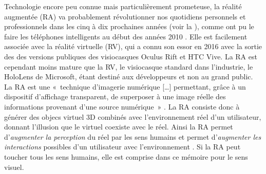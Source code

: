 Technologie encore peu connue mais particulièrement prometeuse, la réalité augmentée (RA) va probablement révolutionner nos quotidiens personnels et professionnels dans les cinq à dix prochaines années (voir la ), comme ont pu le faire les téléphones intelligents au début des années 2010 \citet{Chaffey2018}. Elle est facilement associée avec la réalité virtuelle (RV), qui a connu son essor en 2016 avec la sortie des des versions publiques des visiocasques Oculus Rift et HTC Vive. La RA est cependant moins mature que la RV, le visiocasque standard dans l'industrie, le HoloLens de Microsoft, étant destiné aux développeurs et non au grand public.\\
La RA est une «~technique d'imagerie numérique […] permettant, grâce à un dispositif d'affichage transparent, de superposer à une image réelle des informations provenant d'une source numérique~» \citep{OfficeQuebecoisLangueFrancaiseRA2015}. La RA consiste donc à générer des objecs virtuel 3D combinés avec l'environnement réel d'un utilisateur, donnant l'illusion que le virtuel coexiste avec le réel. Ainsi la RA permet d'\emph{augmenter la perception} du réel par les sens humains et permet d'\emph{augmenter les interactions} possibles d'un utilisateur avec l'environnement \citep{Azuma1997}. Si la RA peut toucher tous les sens humains, elle est comprise dans ce mémoire pour le sens visuel.

